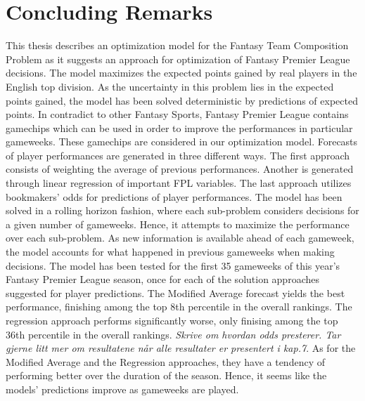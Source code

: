\chapter{Concluding Remarks}

This thesis describes an optimization model for the Fantasy Team Composition Problem as it suggests an approach for optimization of Fantasy Premier League decisions. The model maximizes the expected points gained by real players in the English top division. As the uncertainty in this problem lies in the expected points gained, the model has been solved deterministic by predictions of expected points. In contradict to other Fantasy Sports, Fantasy Premier League contains gamechips which can be used in order to improve the performances in particular gameweeks. These gamechips are considered in our optimization model. Forecasts of player performances are generated in three different ways. The first approach consists of weighting the average of previous performances. Another is generated through linear regression of important FPL variables. The last approach utilizes bookmakers' odds for predictions of player performances. 
\newpar
The model has been solved in a rolling horizon fashion, where each sub-problem considers decisions for a given number of gameweeks. Hence, it attempts to maximize the performance over each sub-problem. As new information is available ahead of each gameweek, the model accounts for what happened in previous gameweeks when making decisions. 
\newpar
The model has been tested for the first 35 gameweeks of this year's Fantasy Premier League season, once for each of the solution approaches suggested for player predictions. The Modified Average forecast yields the best performance, finishing among the top 8th percentile in the overall rankings. The regression approach performs significantly worse, only finising among the top 36th percentile in the overall rankings. \textit{Skrive om hvordan odds presterer. Tar gjerne litt mer om resultatene når alle resultater er presentert i kap.7}. As for the Modified Average and the Regression approaches, they have a tendency of performing better over the duration of the season. Hence, it seems like the models' predictions improve as gameweeks are played. 
